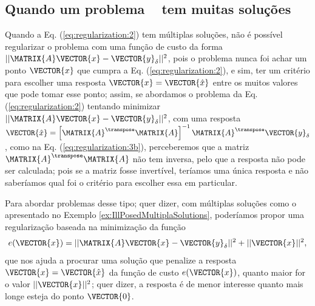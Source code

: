 \subsection{Quando um problema \illposed~ tem muitas soluções}
Quando a Eq. (\ref{eq:regularization:2}) tem múltiplas soluções, 
não é possível regularizar o problema com uma função de custo da forma 
$||\MATRIX{A}\VECTOR{x}-\VECTOR{y}_{\delta}||^2$,
pois o problema nunca foi achar um ponto $\VECTOR{x}$ que cumpra a Eq. (\ref{eq:regularization:2}), 
e sim, ter um critério para escolher uma resposta $\VECTOR{x}=\VECTOR{\hat{x}}$ 
entre os muitos valores que pode tomar esse ponto;
assim, se abordamos o problema da Eq. (\ref{eq:regularization:2}) 
tentando minimizar $||\MATRIX{A}\VECTOR{x}-\VECTOR{y}_{\delta}||^2$,
com uma resposta 
$\VECTOR{\hat{x}} = \left[ \MATRIX{A}^{\transpose} \MATRIX{A} \right]^{-1}\MATRIX{A}^{\transpose}\VECTOR{y}_{\delta}$,
como na Eq. (\ref{eq:regularization:3b}),
perceberemos que a matriz $\MATRIX{A}^{\transpose}\MATRIX{A}$ não tem inversa,
pelo que a resposta não pode ser calculada;
pois se a matriz fosse invertível, teríamos uma única resposta e não saberíamos
qual foi o critério para escolher essa em particular.

Para abordar problemas desse tipo; quer dizer, com múltiplas soluções
como o apresentado no Exemplo \ref{ex:IllPosedMultiplaSolutions}, 
poderíamos propor uma regularização baseada na minimização
da função 
\begin{equation}\label{eq:regularization:4}
e(\VECTOR{x})=||\MATRIX{A}\VECTOR{x}-\VECTOR{y}_{\delta}||^2+||\VECTOR{x}||^2,
\end{equation}
que nos ajuda a procurar uma solução que penalize a resposta $\VECTOR{x}=\VECTOR{\hat{x}}$ da função de custo $e(\VECTOR{x})$, 
quanto maior for o valor $||\VECTOR{x}||^2$;
quer dizer, a resposta é de menor interesse quanto mais longe esteja do ponto $\VECTOR{0}$.

